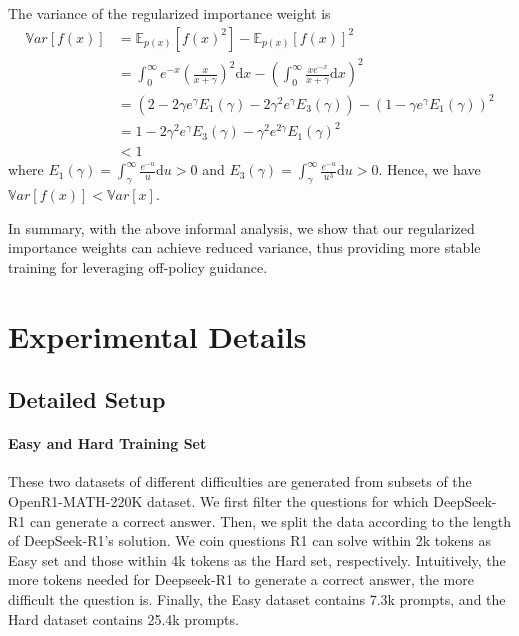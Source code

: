 The variance of the regularized importance weight is
\begin{equation}
	\begin{aligned}
		\mathbb{V}ar[f(x)] & = \mathbb{E}_{p(x)}[f(x)^2]  -  \mathbb{E}_{p(x)}[f(x)]^2 \\
		& =   \int_0^\infty e^{-x}\left(\frac{x}{x+\gamma}\right)^2  \mathrm{d}x - \left( \int_0^\infty \frac{xe^{-x}}{x+\gamma}  \mathrm{d}x \right)^2 \\
		& =  \left(2-2\gamma e^\gamma E_1(\gamma) -2\gamma^2 e^\gamma E_3(\gamma)\right) - \left(1-\gamma e^\gamma E_1(\gamma)\right)^2 \\
        & = 1 - 2\gamma^2 e^\gamma E_3(\gamma) - \gamma^2 e^{2\gamma}E_1(\gamma)^2 \\
        & < 1
	\end{aligned}	
\end{equation}
where $E_1(\gamma)\!=\!\int_\gamma^\infty\frac{e^{-u}}{u}\mathrm{d}u>0$ and $E_3(\gamma)\!=\!\int_\gamma^\infty\frac{e^{-u}}{u^3}\mathrm{d}u>0$.
Hence, we have $\mathbb{V}ar[f(x)]<\mathbb{V}ar[x]$.


In summary, with the above informal analysis, we show that our regularized importance weights can achieve reduced variance, thus providing more stable training for leveraging off-policy guidance.







\section{Experimental Details}
\label{app:exp_details}

\subsection{Detailed Setup}

\paragraph{Easy and Hard Training Set}
These two datasets of different difficulties are generated from subsets of the OpenR1-MATH-220K dataset.
We first filter the questions for which DeepSeek-R1 can generate a correct answer. 
Then, we split the data according to the length of DeepSeek-R1's solution.
We coin questions R1 can solve within 2k tokens as Easy set and those within 4k tokens as the Hard set, respectively. 
Intuitively, the more tokens needed for Deepseek-R1 to generate a correct answer, the more difficult the question is. 
Finally, the Easy dataset contains 7.3k prompts, and the Hard dataset contains 25.4k prompts. 


